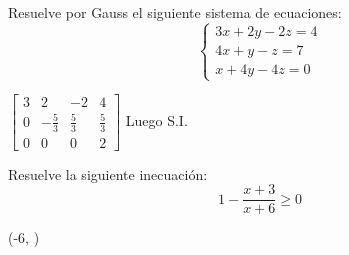 \documentclass[addpoints,spanish, 12pt,a4paper]{exam}
\renewcommand*\half{.5}
\begin{document}
\begin{questions}
\question[2] Resuelve por Gauss el siguiente sistema de ecuaciones:
\[
\begin{cases}
3x + 2y - 2z = 4 \\
4x + y - z = 7 \\
x + 4y - 4z = 0
\end{cases}
\]

\begin{solution}
$\left[\begin{matrix}3 & 2 & -2 & 4\\0 & - \frac{5}{3} & \frac{5}{3} & \frac{5}{3}\\0 & 0 & 0 & 2\end{matrix}\right]$ Luego S.I.
\end{solution}

\question[1\half] Resuelve la siguiente inecuación: $$1-\frac{{x + 3}}{{x + 6}} \geq 0 $$ \begin{solution} \rightarrow \left(-6, \infty\right)\end{solution}




\end{questions}
\end{document}
